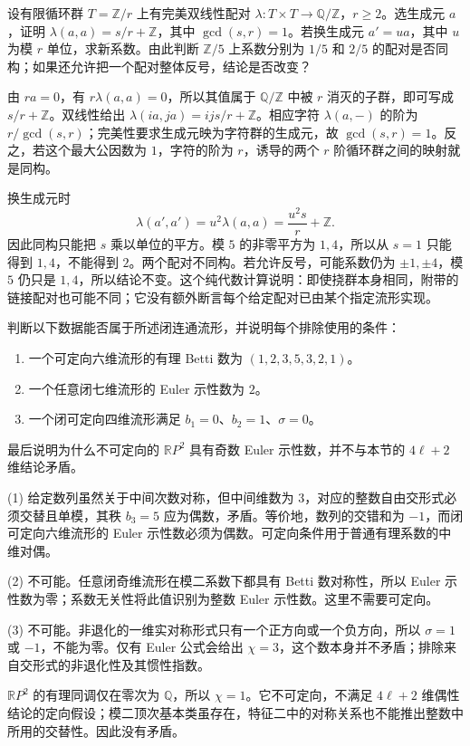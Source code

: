 \begin{exercise}\label{g2:ex:cyclic-linking-changes}
	设有限循环群 \(T=\mathbb Z/r\) 上有完美双线性配对 \(\lambda:T\times T\to\mathbb Q/\mathbb Z\)，\(r\geq2\)。选生成元 \(a\)，证明 \(\lambda(a,a)=s/r+\mathbb Z\)，其中 \(\gcd(s,r)=1\)。若换生成元 \(a'=ua\)，其中 \(u\) 为模 \(r\) 单位，求新系数。由此判断 \(\mathbb Z/5\) 上系数分别为 \(1/5\) 和 \(2/5\) 的配对是否同构；如果还允许把一个配对整体反号，结论是否改变？
\end{exercise}
\begin{solution}
	由 \(ra=0\)，有 \(r\lambda(a,a)=0\)，所以其值属于 \(\mathbb Q/\mathbb Z\) 中被 \(r\) 消灭的子群，即可写成 \(s/r+\mathbb Z\)。双线性给出 \(\lambda(ia,ja)=ijs/r+\mathbb Z\)。相应字符 \(\lambda(a,-)\) 的阶为 \(r/\gcd(s,r)\)；完美性要求生成元映为字符群的生成元，故 \(\gcd(s,r)=1\)。反之，若这个最大公因数为 \(1\)，字符的阶为 \(r\)，诱导的两个 \(r\) 阶循环群之间的映射就是同构。

	换生成元时
	\[
		\lambda(a',a')=u^2\lambda(a,a)=\frac{u^2s}{r}+\mathbb Z.
	\]
	因此同构只能把 \(s\) 乘以单位的平方。模 \(5\) 的非零平方为 \(1,4\)，所以从 \(s=1\) 只能得到 \(1,4\)，不能得到 \(2\)。两个配对不同构。若允许反号，可能系数仍为 \(\pm1,\pm4\)，模 \(5\) 仍只是 \(1,4\)，所以结论不变。这个纯代数计算说明：即使挠群本身相同，附带的链接配对也可能不同；它没有额外断言每个给定配对已由某个指定流形实现。
\end{solution}

\begin{exercise}\label{g2:ex:betti-duality-obstructions}
	判断以下数据能否属于所述闭连通流形，并说明每个排除使用的条件：
	\begin{enumerate}
		\item 一个可定向六维流形的有理 Betti 数为 \((1,2,3,5,3,2,1)\)。
		\item 一个任意闭七维流形的 Euler 示性数为 \(2\)。
		\item 一个闭可定向四维流形满足 \(b_1=0\)、\(b_2=1\)、\(\sigma=0\)。
	\end{enumerate}
	最后说明为什么不可定向的 \(\mathbb RP^2\) 具有奇数 Euler 示性数，并不与本节的 \(4\ell+2\) 维结论矛盾。
\end{exercise}
\begin{solution}
	(1) 给定数列虽然关于中间次数对称，但中间维数为 \(3\)，对应的整数自由交形式必须交替且单模，其秩 \(b_3=5\) 应为偶数，矛盾。等价地，数列的交错和为 \(-1\)，而闭可定向六维流形的 Euler 示性数必须为偶数。可定向条件用于普通有理系数的中维对偶。

	(2) 不可能。任意闭奇维流形在模二系数下都具有 Betti 数对称性，所以 Euler 示性数为零；系数无关性将此值识别为整数 Euler 示性数。这里不需要可定向。

	(3) 不可能。非退化的一维实对称形式只有一个正方向或一个负方向，所以 \(\sigma=1\) 或 \(-1\)，不能为零。仅有 Euler 公式会给出 \(\chi=3\)，这个数本身并不矛盾；排除来自交形式的非退化性及其惯性指数。

	\(\mathbb RP^2\) 的有理同调仅在零次为 \(\mathbb Q\)，所以 \(\chi=1\)。它不可定向，不满足 \(4\ell+2\) 维偶性结论的定向假设；模二顶次基本类虽存在，特征二中的对称关系也不能推出整数中所用的交替性。因此没有矛盾。
\end{solution}
